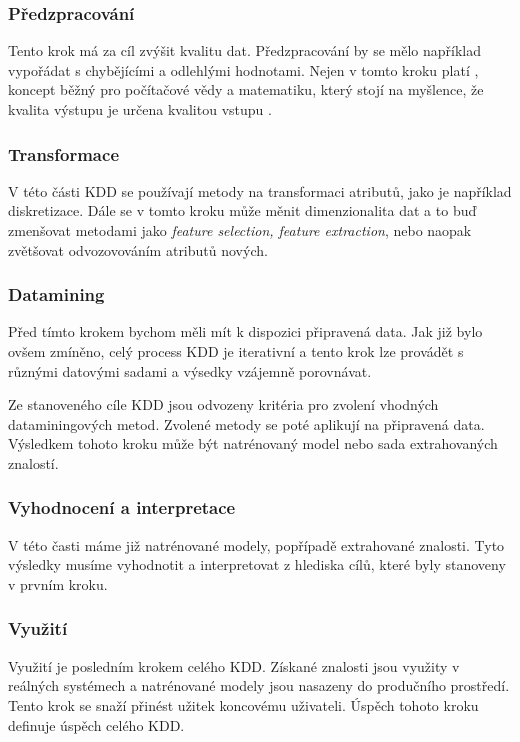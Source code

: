 \documentclass[thesis=M,czech]{FITthesis}[2012/06/26]
\begin{document}
\subsubsection*{Předzpracování}
Tento krok má za cíl zvýšit kvalitu dat. Předzpracování by se mělo například vypořádat s chybějícími a odlehlými hodnotami. Nejen v tomto kroku platí , koncept běžný pro počítačové vědy a matematiku, který stojí na myšlence, že kvalita výstupu je určena kvalitou vstupu \cite{g_in_g_out}.

\subsubsection*{Transformace }
\label{subsec:transformace}

V této části KDD se používají metody na transformaci atributů, jako je například diskretizace. Dále se v tomto kroku může měnit dimenzionalita dat a to buď zmenšovat metodami jako \textit{feature selection, feature extraction}, nebo naopak zvětšovat odvozovováním atributů nových. 


\subsubsection*{Datamining}
Před tímto krokem bychom měli mít k dispozici připravená data. Jak již bylo ovšem zmíněno, celý process KDD je iterativní a tento krok lze provádět s různými datovými sadami a výsedky vzájemně porovnávat.

Ze stanoveného cíle KDD jsou odvozeny kritéria pro zvolení vhodných dataminingových metod. Zvolené metody se poté aplikují na připravená data. Výsledkem tohoto kroku může být natrénovaný model nebo sada extrahovaných znalostí.

\subsubsection*{Vyhodnocení a interpretace}
V této časti máme již natrénované modely, popřípadě extrahované znalosti. Tyto výsledky musíme vyhodnotit a interpretovat z hlediska cílů, které byly stanoveny v prvním kroku.

\subsubsection*{Využití}
Využití je posledním krokem celého KDD. Získané znalosti jsou využity v reálných systémech a natrénované modely jsou nasazeny do produčního prostředí. Tento krok se snaží přinést užitek koncovému uživateli. Úspěch tohoto kroku definuje úspěch celého KDD.	
	
\end{document}
